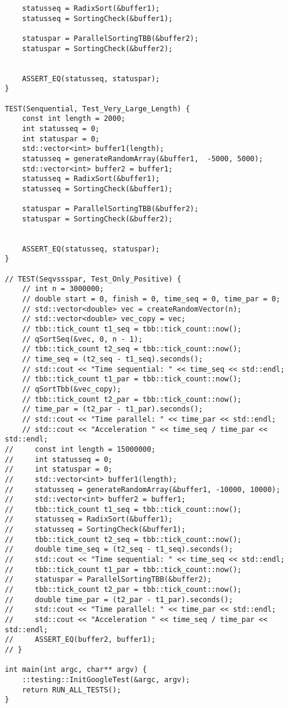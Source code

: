 \documentclass{report}
\begin{document}
\begin{lstlisting}
    statusseq = RadixSort(&buffer1);
    statusseq = SortingCheck(&buffer1);

    statuspar = ParallelSortingTBB(&buffer2);
    statuspar = SortingCheck(&buffer2);


    ASSERT_EQ(statusseq, statuspar);
}

TEST(Senquential, Test_Very_Large_Length) {
    const int length = 2000;
    int statusseq = 0;
    int statuspar = 0;
    std::vector<int> buffer1(length);
    statusseq = generateRandomArray(&buffer1,  -5000, 5000);
    std::vector<int> buffer2 = buffer1;
    statusseq = RadixSort(&buffer1);
    statusseq = SortingCheck(&buffer1);

    statuspar = ParallelSortingTBB(&buffer2);
    statuspar = SortingCheck(&buffer2);


    ASSERT_EQ(statusseq, statuspar);
}

// TEST(Seqvssspar, Test_Only_Positive) {
    // int n = 3000000;
    // double start = 0, finish = 0, time_seq = 0, time_par = 0;
    // std::vector<double> vec = createRandomVector(n);
    // std::vector<double> vec_copy = vec;
    // tbb::tick_count t1_seq = tbb::tick_count::now();
    // qSortSeq(&vec, 0, n - 1);
    // tbb::tick_count t2_seq = tbb::tick_count::now();
    // time_seq = (t2_seq - t1_seq).seconds();
    // std::cout << "Time sequential: " << time_seq << std::endl;
    // tbb::tick_count t1_par = tbb::tick_count::now();
    // qSortTbb(&vec_copy);
    // tbb::tick_count t2_par = tbb::tick_count::now();
    // time_par = (t2_par - t1_par).seconds();
    // std::cout << "Time parallel: " << time_par << std::endl;
    // std::cout << "Acceleration " << time_seq / time_par << std::endl;
//     const int length = 15000000;
//     int statusseq = 0;
//     int statuspar = 0;
//     std::vector<int> buffer1(length);
//     statusseq = generateRandomArray(&buffer1, -10000, 10000);
//     std::vector<int> buffer2 = buffer1;
//     tbb::tick_count t1_seq = tbb::tick_count::now();
//     statusseq = RadixSort(&buffer1);
//     statusseq = SortingCheck(&buffer1);
//     tbb::tick_count t2_seq = tbb::tick_count::now();
//     double time_seq = (t2_seq - t1_seq).seconds();
//     std::cout << "Time sequential: " << time_seq << std::endl;
//     tbb::tick_count t1_par = tbb::tick_count::now();
//     statuspar = ParallelSortingTBB(&buffer2);
//     tbb::tick_count t2_par = tbb::tick_count::now();
//     double time_par = (t2_par - t1_par).seconds();
//     std::cout << "Time parallel: " << time_par << std::endl;
//     std::cout << "Acceleration " << time_seq / time_par << std::endl;
//     ASSERT_EQ(buffer2, buffer1);
// }

int main(int argc, char** argv) {
    ::testing::InitGoogleTest(&argc, argv);
    return RUN_ALL_TESTS();
}


\end{lstlisting}
\end{document}
